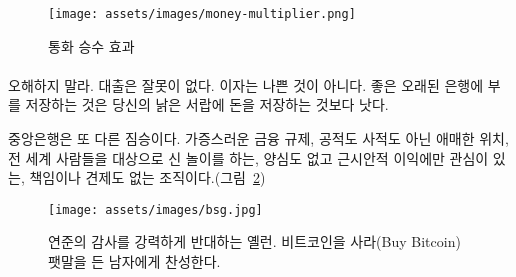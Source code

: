 \begin{comment}
\begin{figure}
  \centering
  \texttt{[image: assets/images/money-multiplier.png]}
  \caption{The money multiplier effect}
  \label{fig:money-multiplier}
\end{figure}
\end{comment}
\begin{figure}
  \centering
  \texttt{[image: assets/images/money-multiplier.png]}
  \caption{통화 승수 효과}
  \label{fig:money-multiplier}
\end{figure}

\paragraph{}
\begin{comment}
Don't get me wrong: There is nothing wrong with lending. There is
nothing wrong with interest. There isn't even anything wrong with good
old regular banks to store your wealth somewhere more secure than in
your sock drawer.
\end{comment}
오해하지 말라. 대출은 잘못이 없다. 
이자는 나쁜 것이 아니다. 
좋은 오래된 은행에 부를 저장하는 것은 당신의 낡은 서랍에 돈을 저장하는 것보다 낫다.

\begin{comment}
Central banks, however, are a different beast. Abominations of financial
regulation, half public half private, playing god with something which
affects everyone who is part of our global civilization, without a
conscience, only interested in the immediate future, and seemingly
without any accountability or auditability (see Figure~\ref{fig:bsg}).
\end{comment}
중앙은행은 또 다른 짐승이다. 
가증스러운 금융 규제, 공적도 사적도 아닌 애매한 위치, 
전 세계 사람들을 대상으로 신 놀이를 하는, 양심도 없고 근시안적 이익에만 관심이 있는, 
책임이나 견제도 없는 조직이다.(그림~\ref{fig:bsg})

\begin{comment}
\begin{figure}
  \centering
  \texttt{[image: assets/images/bsg.jpg]}
  \caption{Yellen is strongly opposed to audit the Fed, while Bitcoin Sign Guy is strongly in favor of buying bitcoin.}
  \label{fig:bsg}
\end{figure}
\end{comment}
\begin{figure}
  \centering
  \texttt{[image: assets/images/bsg.jpg]}
  \caption{연준의 감사를 강력하게 반대하는 옐런. 비트코인을 사라(Buy Bitcoin) 팻말을 든 남자에게 찬성한다.}
  \label{fig:bsg}
\end{figure}

